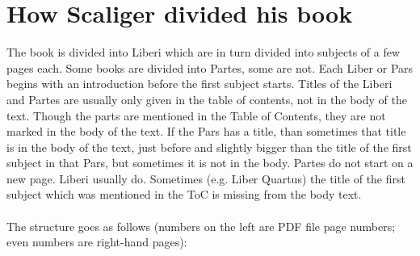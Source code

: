 \documentclass{report}
\begin{document}
\chapter{How Scaliger divided his book}
The book is divided into Liberi which are in turn divided into subjects of
 a few pages each. Some books are divided into Partes, some are not.
 Each Liber or Pars begins with an introduction before the first subject starts. 
 Titles of the Liberi and Partes are usually only given in the table of
 contents, not in the body of the text. Though the parts are mentioned in the
 Table of Contents, they are not marked in the body of the text.
 If the Pars has a title, than sometimes that title is in the body of the text,
 just before and slightly bigger than the title of the first subject in that
 Pars, but sometimes it is not in the body. Partes do not start on a new page.
 Liberi usually do. Sometimes (e.g. Liber Quartus) the title of the first
 subject which was mentioned in the ToC is missing from the body text.
~
\\
\\
The structure goes as follows (numbers on the left are PDF file page numbers;
 even numbers are right-hand pages):
\end{document}
